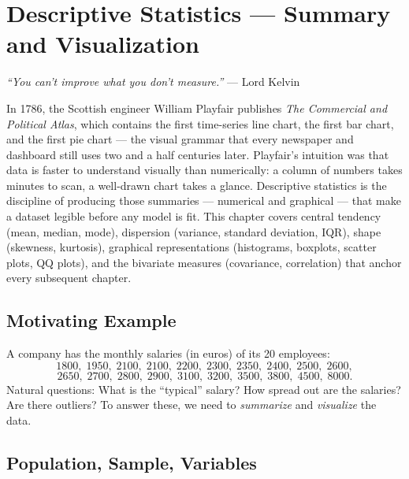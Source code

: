 \chapter{Descriptive Statistics --- Summary and Visualization}
\label{ch:descriptive}

\begin{center}
\textit{``You can't improve what you don't measure.''} --- Lord Kelvin
\end{center}

In 1786, the Scottish engineer William Playfair publishes \emph{The Commercial and Political Atlas}, which contains the first time-series line chart, the first bar chart, and the first pie chart --- the visual grammar that every newspaper and dashboard still uses two and a half centuries later. Playfair's intuition was that data is faster to understand visually than numerically: a column of numbers takes minutes to scan, a well-drawn chart takes a glance. Descriptive statistics is the discipline of producing those summaries --- numerical and graphical --- that make a dataset legible before any model is fit. This chapter covers central tendency (mean, median, mode), dispersion (variance, standard deviation, IQR), shape (skewness, kurtosis), graphical representations (histograms, boxplots, scatter plots, QQ plots), and the bivariate measures (covariance, correlation) that anchor every subsequent chapter.

\section{Motivating Example}

A company has the monthly salaries (in euros) of its 20 employees:
\[
1800,\; 1950,\; 2100,\; 2100,\; 2200,\; 2300,\; 2350,\; 2400,\; 2500,\; 2600,
\]
\[
2650,\; 2700,\; 2800,\; 2900,\; 3100,\; 3200,\; 3500,\; 3800,\; 4500,\; 8000.
\]
Natural questions: What is the ``typical'' salary? How spread out are the salaries? Are there outliers? To answer these, we need to \emph{summarize} and \emph{visualize} the data.

\section{Population, Sample, Variables}


